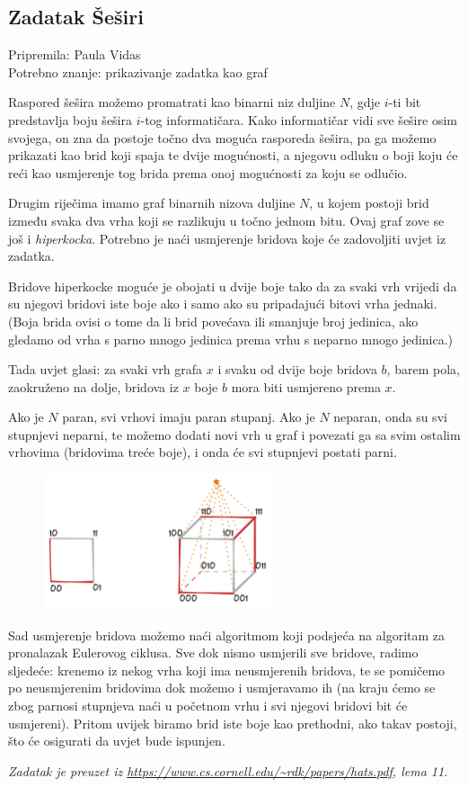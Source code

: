 \subsection*{Zadatak Šeširi}
\textsf{Pripremila: Paula Vidas}\\
\textsf{Potrebno znanje: prikazivanje zadatka kao graf}

Raspored šešira možemo promatrati kao binarni niz duljine $N$, gdje $i$-ti bit
predstavlja boju šešira $i$-tog informatičara.
Kako informatičar vidi sve šešire osim svojega, on zna da postoje točno dva moguća
rasporeda šešira, pa ga možemo prikazati kao brid koji spaja te dvije mogućnosti,
a njegovu odluku o boji koju će reći kao usmjerenje tog brida prema onoj mogućnosti
za koju se odlučio.

Drugim riječima imamo graf binarnih nizova duljine $N$, u kojem postoji brid
između svaka dva vrha koji se razlikuju u točno jednom bitu. Ovaj graf zove se još
i \textit{hiperkocka}. Potrebno je naći usmjerenje bridova koje će zadovoljiti
uvjet iz zadatka.

Bridove hiperkocke moguće je obojati u dvije boje tako da za svaki vrh vrijedi da su njegovi
bridovi iste boje ako i samo ako su pripadajući bitovi vrha jednaki. (Boja brida ovisi o tome
da li brid povećava ili smanjuje broj jedinica, ako gledamo od vrha s parno mnogo jedinica
prema vrhu s neparno mnogo jedinica.)

Tada uvjet glasi: za svaki vrh grafa $x$ i svaku od dvije boje bridova $b$, barem pola,
zaokruženo na dolje, bridova iz $x$ boje $b$ mora biti usmjereno prema $x$.

Ako je $N$ paran, svi vrhovi imaju paran stupanj. Ako je $N$ neparan, onda
su svi stupnjevi neparni, te možemo dodati novi vrh u graf i povezati ga sa svim ostalim
vrhovima (bridovima treće boje), i onda će svi stupnjevi postati parni.

\begin{figure}[H]
    \centering
    \includegraphics[width=0.6\textwidth]{img/sesiri_editorial.excalidraw.png}
\end{figure}

Sad usmjerenje bridova možemo naći algoritmom koji podsjeća na algoritam za pronalazak
Eulerovog ciklusa. Sve dok nismo usmjerili sve bridove, radimo sljedeće: krenemo iz nekog
vrha koji ima neusmjerenih bridova, te se pomičemo po neusmjerenim bridovima dok možemo i usmjeravamo ih
(na kraju ćemo se zbog parnosi stupnjeva naći u početnom vrhu i svi njegovi bridovi bit će usmjereni).
Pritom uvijek biramo brid iste boje kao prethodni, ako takav postoji, što će osigurati da uvjet bude ispunjen.

\bigskip

\textit{Zadatak je preuzet iz \url{https://www.cs.cornell.edu/~rdk/papers/hats.pdf}, lema 11.}
